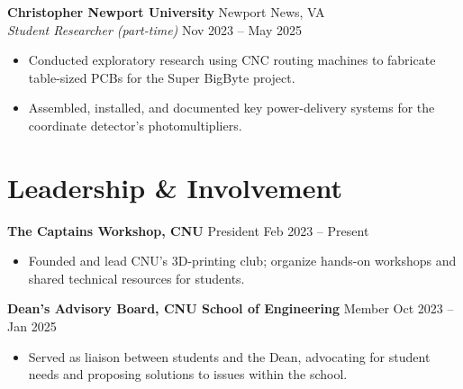 \documentclass[10pt]{article}
\begin{document}
\textbf{Christopher Newport University} \hfill Newport News, VA\\
\emph{Student Researcher (part-time)} \hfill Nov 2023 -- May 2025
\begin{itemize}
  \item Conducted exploratory research using CNC routing machines to fabricate
  table-sized PCBs for the Super BigByte project.
  \item Assembled, installed, and documented key power-delivery systems for the
  coordinate detector's photomultipliers.
\end{itemize}

\section*{Leadership \& Involvement}
\textbf{The Captains Workshop, CNU} \hfill President \hfill Feb 2023 -- Present
\begin{itemize}
  \item Founded and lead CNU's 3D-printing club; organize hands-on workshops and
  shared technical resources for students.
\end{itemize}

\textbf{Dean's Advisory Board, CNU School of Engineering} \hfill Member
\hfill Oct 2023 -- Jan 2025
\begin{itemize}
  \item Served as liaison between students and the Dean, advocating for student
  needs and proposing solutions to issues within the school.
\end{itemize}
\end{document}

